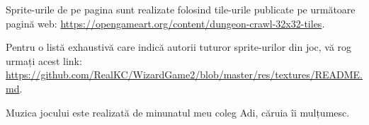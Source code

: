 \documentclass{article}
\begin{document}
    Sprite-urile de pe pagina \pageref{sec:sprites} sunt realizate folosind tile-urile publicate
    pe următoare pagină web: \url{https://opengameart.org/content/dungeon-crawl-32x32-tiles}.

    Pentru o listă exhaustivă care indică autorii tuturor sprite-urilor din joc, vă rog urmați
    acest link: \url{https://github.com/RealKC/WizardGame2/blob/master/res/textures/README.md}.

    Muzica jocului este realizată de minunatul meu coleg Adi, căruia îi mulțumesc.
\end{document}
